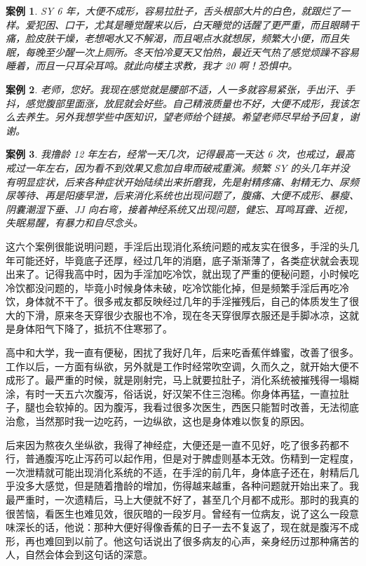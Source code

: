 \documentclass{ctexart}
\newtheorem{case}{案例}
\begin{document}
\begin{case}
    SY 6 年，大便不成形，容易拉肚子，舌头根部大片的白色，就跟烂了一样。爱犯困、口干，尤其是睡觉醒来以后，白天睡觉的话醒了更严重，而且眼睛干痛，脸皮肤干燥，老想喝水又不解渴，而且喝点水就想尿，频繁大小便，而且失眠，每晚至少醒一次上厕所。冬天怕冷夏天又怕热，最近天气热了感觉烦躁不容易睡着，而且一只耳朵耳鸣。就此向楼主求教，我才 20 啊！恐惧中。
\end{case}

\begin{case}
    老师，您好。我现在感觉就是腰部不适，人一多就容易紧张，手出汗、手抖，感觉腹部里面涨，放屁就会好些。自己精液质量也不好，大便不成形，我该怎么去养生。另外我想学些中医知识，望老师给个链接。希望老师尽早给予回复，谢谢。
\end{case}

\begin{case}
    我撸龄 12 年左右，经常一天几次，记得最高一天达 6 次，也戒过，最高戒过一年左右，因为看不到效果又愈加自卑而破戒重演。频繁 SY 的头几年并没有明显症状，后来各种症状开始陆续出来折磨我，先是射精疼痛、射精无力、尿频尿等待、再是阳痿早泄，后来消化系统也出现问题了，腹痛、大便不成形、暴瘦、阴囊潮湿下垂、JJ 向右弯，接着神经系统又出现问题，健忘、耳鸣耳聋、近视，失眠易醒，有暴力和自尽念头。
\end{case}

这六个案例很能说明问题，手淫后出现消化系统问题的戒友实在很多，手淫的头几年可能还好，毕竟底子还厚，经过几年的消磨，底子渐渐薄了，各类症状就会表现出来了。记得我高中时，因为手淫加吃冷饮，就出现了严重的便秘问题，小时候吃冷饮都没问题的，毕竟小时候身体未破，吃冷饮能化掉，但是频繁手淫后再吃冷饮，身体就不干了。很多戒友都反映经过几年的手淫摧残后，自己的体质发生了很大的下滑，原来冬天穿很少衣服也不冷，现在冬天穿很厚衣服还是手脚冰凉，这就是身体阳气下降了，抵抗不住寒邪了。

高中和大学，我一直有便秘，困扰了我好几年，后来吃香蕉伴蜂蜜，改善了很多。工作以后，一方面有纵欲，另外就是工作时经常吹空调，久而久之，就开始大便不成形了。最严重的时候，就是刚射完，马上就要拉肚子，消化系统被摧残得一塌糊涂，有时一天五六次腹泻，俗话说，好汉架不住三泡稀。你身体再猛，一直拉肚子，腿也会软掉的。因为腹泻，我看过很多次医生，西医只能暂时改善，无法彻底治愈，当然那时我一边吃药，一边纵欲，这也是身体难以恢复的原因。

后来因为熬夜久坐纵欲，我得了神经症，大便还是一直不见好，吃了很多药都不行，普通腹泻吃止泻药可以起作用，但是对于脾虚则基本无效。伤精到一定程度，一次泄精就可能出现消化系统的不适，在手淫的前几年，身体底子还在，射精后几乎没多大感觉，但是随着撸龄的增加，伤得越来越重，各种问题就开始出来了。我最严重时，一次遗精后，马上大便就不好了，甚至几个月都不成形。那时的我真的很苦恼，看医生也难见效，很灰暗的一段岁月。曾经有一位病友，说了这么一段意味深长的话，他说：那种大便好得像香蕉的日子一去不复返了，现在就是腹泻不成形，再也难回到以前了。他这句话说出了很多病友的心声，亲身经历过那种痛苦的人，自然会体会到这句话的深意。
\end{document}

